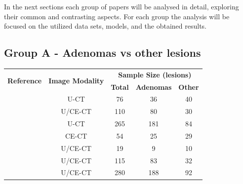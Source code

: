 \documentclass{article}
\begin{document}
In the next sections each group of papers will be analysed in detail, exploring their common and contrasting aspects. For each group the analysis will be focused on the utilized data sets, models, and the obtained results.

\subsection{Group A - Adenomas vs other lesions}

\begin{table}[]
    \centering
    \begin{tabular}{ccccc}\toprule
        \multirow{2}{*}{\textbf{Reference}} & \multirow{2}{*}{\textbf{Image Modality}} & \multicolumn{3}{c}{\textbf{Sample Size (lesions)}}
        \\\cmidrule(lr){3-5}
                                            &                                          & \textbf{Total}                                     & \textbf{Adenomas} & \textbf{Other} \\\midrule
        \cite{Tu2018}                       & U-CT                                     & 76                                                 & 36                & 40             \\
        \cite{Yi20181}                      & U/CE-CT                                  & 110                                                & 80                & 30             \\
        \cite{Yi2018}                       & U-CT                                     & 265                                                & 181               & 84             \\
        \cite{Elmohr2019}                   & CE-CT                                    & 54                                                 & 25                & 29             \\
        \cite{Torresan2021}                 & U/CE-CT                                  & 19                                                 & 9                 & 10             \\
        \cite{Kusunoki2022}                 & U/CE-CT                                  & 115                                                & 83                & 32             \\
        \cite{Liu2022}                      & U/CE-CT                                  & 280                                                & 188               & 92             \\

\end{tabular}
\end{table}
\end{document}
